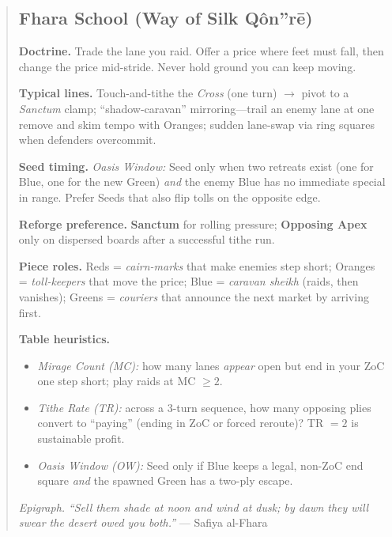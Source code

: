 \documentclass[11pt]{article}
\begin{document}
\begin{quote}
\clearpage
\subsection*{Fhara School (Way of Silk Qôn''rē)}

\noindent\textbf{Doctrine.} Trade the lane you raid. Offer a price where feet must fall, then change the price mid-stride. Never hold ground you can keep moving.

\medskip
\noindent\textbf{Typical lines.} Touch-and-tithe the \emph{Cross} (one turn) $\rightarrow$ pivot to a \emph{Sanctum} clamp; ``shadow-caravan'' mirroring---trail an enemy lane at one remove and skim tempo with Oranges; sudden lane-swap via ring squares when defenders overcommit.

\medskip
\noindent\textbf{Seed timing.} \emph{Oasis Window:} Seed only when two retreats exist (one for Blue, one for the new Green) \emph{and} the enemy Blue has no immediate special in range. Prefer Seeds that also flip tolls on the opposite edge.

\medskip
\noindent\textbf{Reforge preference.} \textbf{Sanctum} for rolling pressure; \textbf{Opposing Apex} only on dispersed boards after a successful tithe run.

\medskip
\noindent\textbf{Piece roles.} Reds = \emph{cairn-marks} that make enemies step short; Oranges = \emph{toll-keepers} that move the price; Blue = \emph{caravan sheikh} (raids, then vanishes); Greens = \emph{couriers} that announce the next market by arriving first.

\medskip
\noindent\textbf{Table heuristics.}
\begin{itemize}[leftmargin=1.3em,itemsep=0.2em]
  \item \emph{Mirage Count (MC):} how many lanes \emph{appear} open but end in your ZoC one step short; play raids at MC $\ge 2$.
  \item \emph{Tithe Rate (TR):} across a 3-turn sequence, how many opposing plies convert to ``paying'' (ending in ZoC or forced reroute)? TR $= 2$ is sustainable profit.
  \item \emph{Oasis Window (OW):} Seed only if Blue keeps a legal, non-ZoC end square \emph{and} the spawned Green has a two-ply escape.
\end{itemize}

\medskip
\noindent\textit{Epigraph.} \emph{``Sell them shade at noon and wind at dusk; by dawn they will swear the desert owed you both.''} --- Safiya al-Fhara


\end{quote}
\end{document}
